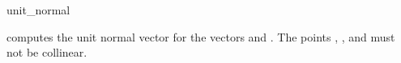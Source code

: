 \begin{ccRefFunction}{unit_normal}

 {computes the unit normal vector for the  vectors  and .
 \ccPrecond The points , , and  must not be collinear.}


\end{ccRefFunction}

